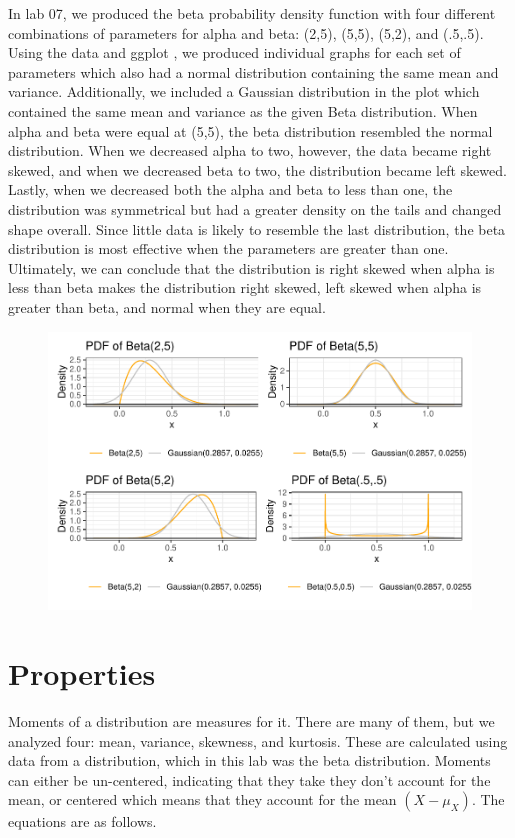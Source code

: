 \documentclass{article}\usepackage[]{graphicx}\usepackage[]{xcolor}
\begin{document}
\begin{multicols}{2}
  In lab 07, we produced the beta probability density function with four different combinations of parameters for alpha and beta: (2,5), (5,5), (5,2), and (.5,.5). Using the data and ggplot \citep{ggplot2}, we produced individual graphs for each set of parameters which also had a normal distribution containing the same mean and variance. Additionally, we included a Gaussian distribution in the plot which contained the same mean and variance as the given Beta distribution. When alpha and beta were equal at (5,5), the beta distribution resembled the normal distribution. When we decreased alpha to two, however, the data became right skewed, and when we decreased beta to two, the distribution became left skewed. Lastly, when we decreased both the alpha and beta to less than one, the distribution was symmetrical but had a greater density on the tails and changed shape overall. Since little data is likely to resemble the last distribution, the beta distribution is most effective when the parameters are greater than one. Ultimately, we can conclude that the distribution is right skewed when alpha is less than beta makes the distribution right skewed, left skewed when alpha is greater than beta, and normal when they are equal. 
  
  
   \begin{figure}[H]
    \begin{center}
       \includegraphics[scale=0.5]{densityf.pdf}
       \caption{}
     \label{densityf}
     \end{center}
   \end{figure}

\section{Properties}
Moments of a distribution are measures for it. There are many of them, but we analyzed four: mean, variance, skewness, and kurtosis. These are calculated using data from a distribution, which in this lab was the beta distribution. Moments can either be un-centered, indicating that they take they don't account for the mean, or centered which means that they account for the mean $(X-\mu_X)$. The equations are as follows. 



\end{multicols}
\end{document}
